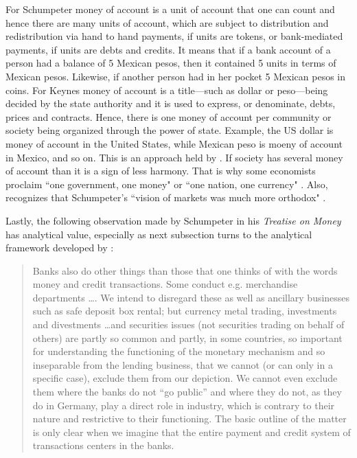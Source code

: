For Schumpeter money of account is a unit of account that one can count and hence there are many units of account, which are subject to distribution and redistribution via hand to hand payments, if units are tokens, or bank-mediated payments, if units are debts and credits. It means that if a bank account of a person had a balance of 5 Mexican pesos, then it contained 5 units in terms of Mexican pesos. Likewise, if another person had in her pocket 5 Mexican pesos in coins. For Keynes money of account is a title---such as dollar or peso---being decided by the state authority and it is used to express, or denominate, debts, prices and contracts. Hence, there is one money of account per community or society being organized through the power of state. Example, the US dollar is money of account in the United States, while Mexican peso is moeny of account in Mexico, and so on. This is an approach held by \citeauthor{innes}. If society has several money of account than it is a sign of less harmony. That is why some economists proclaim ``one government, one money" \citep{goodhart2017} or ``one nation, one currency" \citep[pp.~41-42]{wray2012}. Also, \citeauthor{wray2009} recognizes that Schumpeter's ``vision of markets was much more orthodox" \citep[p.~810]{wray2009}.

Lastly, the following observation made by Schumpeter in his \textit{Treatise on Money} has analytical value, especially as next subsection turns to the analytical framework developed by \citeauthor{minsky1986}:

\begin{quote}
Banks also do other things than those that one thinks of with the words
money and credit transactions. Some conduct e.g. merchandise departments \dots. We intend to disregard these as well as ancillary businesses such as
safe deposit box rental; but currency metal trading, investments and divestments \dots and securities issues (not securities trading on behalf of others) are partly so common and partly, in some countries, so important for understanding the functioning of the monetary
mechanism and so inseparable from the lending business, that we cannot (or can
only in a specific case), exclude them from our depiction. We cannot even
exclude them where the banks do not ``go public'' and where they do not, as they
do in Germany, play a direct role in industry, which is contrary to their nature
and restrictive to their functioning. The basic outline of the matter is only clear when we imagine that the entire payment and credit system of transactions centers in the banks.~\citep[p.~154]{schumpeter2014}
\end{quote}

